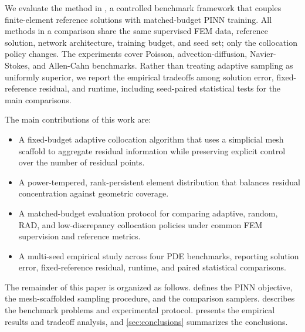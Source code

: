 We evaluate the method in \pinnpoint, a controlled benchmark framework that
couples finite-element reference solutions with matched-budget PINN training.
All methods in a comparison share the same supervised FEM data, reference
solution, network architecture, training budget, and seed set; only the
collocation policy changes.  The experiments cover Poisson, advection-diffusion,
Navier-Stokes, and Allen-Cahn benchmarks.  Rather than treating adaptive
sampling as uniformly superior, we report the empirical tradeoffs among solution
error, fixed-reference residual, and runtime, including seed-paired statistical
tests for the main comparisons.

The main contributions of this work are:
\begin{itemize}
    \item A fixed-budget adaptive collocation algorithm that uses a simplicial mesh scaffold to aggregate residual information while preserving explicit control over the number of residual points.
    \item A power-tempered, rank-persistent element distribution that balances residual concentration against geometric coverage.
    \item A matched-budget evaluation protocol for comparing adaptive, random, RAD, and low-discrepancy collocation policies under common FEM supervision and reference metrics.
    \item A multi-seed empirical study across four PDE benchmarks, reporting solution error, fixed-reference residual, runtime, and paired statistical comparisons.
\end{itemize}

The remainder of this paper is organized as follows.  
defines the PINN objective, the mesh-scaffolded sampling procedure, and the
comparison samplers.   describes the benchmark problems
and experimental protocol.   presents the empirical results
and tradeoff analysis, and \cref{sec:conclusions} summarizes the conclusions.
